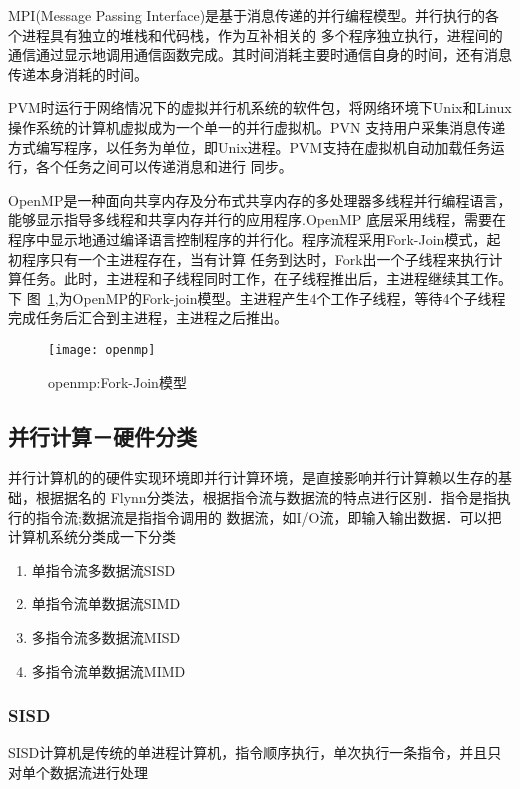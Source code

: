     MPI(Message Passing Interface)是基于消息传递的并行编程模型。并行执行的各个进程具有独立的堆栈和代码栈，作为互补相关的
多个程序独立执行，进程间的通信通过显示地调用通信函数完成。其时间消耗主要时通信自身的时间，还有消息传递本身消耗的时间\cite{Zhangwusheng}。

    PVM时运行于网络情况下的虚拟并行机系统的软件包，将网络环境下Unix和Linux操作系统的计算机虚拟成为一个单一的并行虚拟机。PVN
支持用户采集消息传递方式编写程序，以任务为单位，即Unix进程。PVM支持在虚拟机自动加载任务运行，各个任务之间可以传递消息和进行
同步\cite{Wanglei}。

    OpenMP是一种面向共享内存及分布式共享内存的多处理器多线程并行编程语言，能够显示指导多线程和共享内存并行的应用程序.OpenMP
底层采用线程，需要在程序中显示地通过编译语言控制程序的并行化。程序流程采用Fork-Join模式，起初程序只有一个主进程存在，当有计算
任务到达时，Fork出一个子线程来执行计算任务。此时，主进程和子线程同时工作，在子线程推出后，主进程继续其工作。下
图~\ref{fig:openmp},为OpenMP的Fork-join模型。主进程产生4个工作子线程，等待4个子线程完成任务后汇合到主进程，主进程之后推出。

    \begin{figure}[htbp]
    \centering
    \texttt{[image: openmp]}
    \caption{openmp:Fork-Join模型}\label{fig:openmp}
    \vspace{\baselineskip}
    \end{figure}


\subsection{并行计算－硬件分类}
    并行计算机的的硬件实现环境即并行计算环境，是直接影响并行计算赖以生存的基础，根据据名的
Flynn分类法，根据指令流与数据流的特点进行区别．指令是指执行的指令流;数据流是指指令调用的
数据流，如I/O流，即输入输出数据．可以把计算机系统分类成一下分类
    \begin{enumerate}
    \item 单指令流多数据流SISD
    \item 单指令流单数据流SIMD
    \item 多指令流多数据流MISD
    \item 多指令流单数据流MIMD
    \end{enumerate}
\subsubsection{SISD}
    SISD计算机是传统的单进程计算机，指令顺序执行，单次执行一条指令，并且只对单个数据流进行处理
